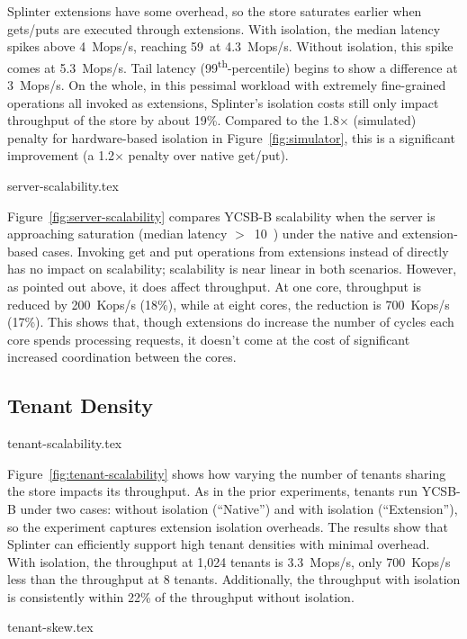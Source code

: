 Splinter extensions have some overhead, so the store saturates
  earlier when gets/puts are executed through extensions.
With isolation, the median latency spikes above 4~Mops/s, reaching 59~\us at
  4.3~Mops/s.
Without isolation, this spike comes at 5.3~Mops/s.
Tail latency (99\textsuperscript{th}-percentile) begins to show a difference at
  3~Mops/s.
On the whole, in this pessimal workload with extremely fine-grained operations
  all invoked as extensions, Splinter's isolation costs still only impact
  throughput of the store by about 19\%.
Compared to the 1.8$\times$ (simulated) penalty for hardware-based
  isolation in Figure~\ref{fig:simulator}, this is a significant
  improvement (a 1.2$\times$ penalty over native get/put).

 {server-scalability.tex}

Figure~\ref{fig:server-scalability} compares YCSB-B scalability when the server
  is approaching saturation (median latency $>$~10~\us) under the native and
  extension-based cases.
Invoking get and put operations from extensions instead of directly has no
  impact on scalability; scalability is near linear in both scenarios.
However, as pointed out above, it does affect throughput.
At one core, throughput is reduced by 200~Kops/s (18\%), while at eight cores,
  the reduction is 700~Kops/s (17\%).
This shows that, though extensions do increase the number of cycles each core
  spends processing requests, it doesn't come at the cost of significant
  increased coordination between the cores.

\subsection{Tenant Density}

 {tenant-scalability.tex}

Figure~\ref{fig:tenant-scalability} shows how varying the number of tenants
  sharing the store impacts its throughput.
As in the prior experiments, tenants run YCSB-B under two cases:
without isolation (``Native'') and with isolation (``Extension''), so the
experiment captures extension isolation
  overheads.
The results show that Splinter can efficiently support high tenant densities
  with minimal overhead.
With isolation, the throughput at 1,024 tenants is 3.3~Mops/s, only
700~Kops/s less than the throughput at 8 tenants. Additionally,
the throughput with isolation is consistently within 22\% of the throughput
without isolation.

 {tenant-skew.tex}

